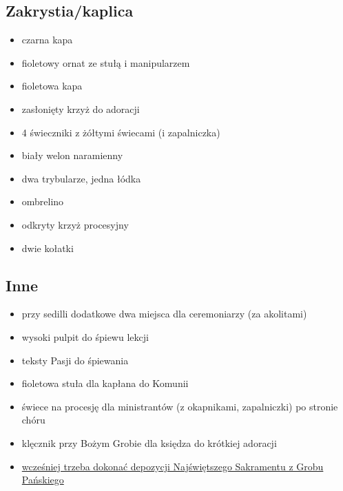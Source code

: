 \subsection{Zakrystia/kaplica}

\begin{itemize}
    \item czarna kapa
    \item {\color{violet} fioletowy} ornat ze stułą i manipularzem
    \item {\color{violet} fioletowa} kapa
    \item zasłonięty krzyż do adoracji
    \item 4 świeczniki z żółtymi świecami (i zapalniczka)
    \item biały welon naramienny
    \item dwa trybularze, jedna łódka
    \item ombrelino
    \item odkryty krzyż procesyjny
    \item dwie kołatki
\end{itemize}

\subsection{Inne}

\begin{itemize}
    \item przy sedilli dodatkowe dwa miejsca dla ceremoniarzy (za akolitami)
    \item wysoki pulpit do śpiewu lekcji
    \item teksty Pasji do śpiewania
    \item {\color{violet} fioletowa} stuła dla kapłana do Komunii
    \item świece na procesję dla ministrantów (z okapnikami, zapalniczki) po
          stronie chóru
    \item klęcznik przy Bożym Grobie dla księdza do krótkiej adoracji
    \item \underline{wcześniej trzeba dokonać depozycji Najświętszego Sakramentu z Grobu
              Pańskiego}
\end{itemize}

